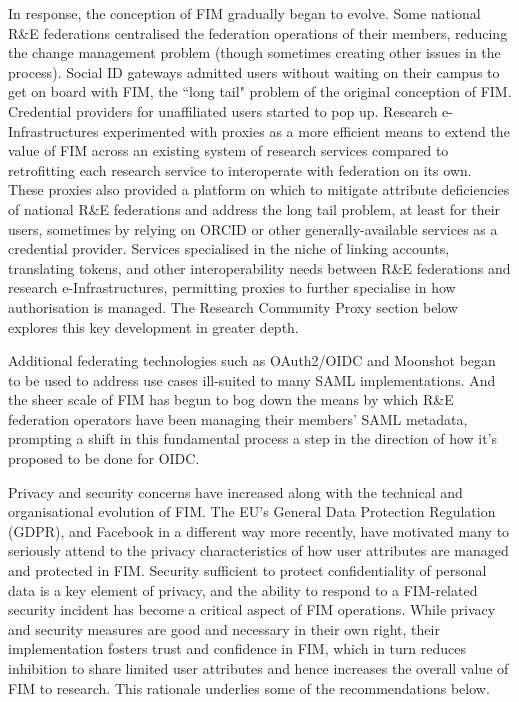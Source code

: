 \documentclass[fleqn,10pt]{wlscirep}
\begin{document}
{In response, the conception of FIM gradually began to evolve. Some national R\&E federations centralised the federation operations of their members, reducing the change management problem (though sometimes creating other issues in the process). Social ID gateways admitted users without waiting on their campus to get on board with FIM, the ``long tail" problem of the original conception of FIM. Credential providers for unaffiliated users started to pop up. Research e-Infrastructures experimented with proxies as a more efficient means to extend the value of FIM across an existing system of research services compared to retrofitting each research service to interoperate with federation on its own. These proxies also provided a platform on which to mitigate attribute deficiencies of national R\&E federations and address the long tail problem, at least for their users, sometimes by relying on ORCID\cite{orcid} or other generally-available services as a credential provider. Services specialised in the niche of linking accounts, translating tokens, and other interoperability needs between R\&E federations and research e-Infrastructures, permitting proxies to further specialise in how authorisation is managed. The Research Community Proxy section below explores this key development in greater depth.

Additional federating technologies such as OAuth2/OIDC\cite{oidc} and Moonshot\cite{moonshot} began to be used to address use cases ill-suited to many SAML implementations. And the sheer scale of FIM has begun to bog down the means by which R\&E federation operators have been managing their members’ SAML metadata, prompting a shift in this fundamental process a step in the direction of how it’s proposed to be done for OIDC\cite{oidcfed}. 

Privacy and security concerns have increased along with the technical and organisational evolution of FIM. The EU’s General Data Protection Regulation (GDPR)\cite{GDPR:2016}\cite{eugdpr}, and Facebook in a different way more recently, have motivated many to seriously attend to the privacy characteristics of how user attributes are managed and protected in FIM\cite{assessdp}\cite{attributerelease}\cite{baseline}\cite{dpcoco}. Security sufficient to protect confidentiality of personal data is a key element of privacy, and the ability to respond to a FIM-related security incident has become a critical aspect of FIM operations\cite{sirtfi}. While privacy and security measures are good and necessary in their own right, their implementation fosters trust and confidence in FIM, which in turn reduces inhibition to share limited user attributes and hence increases the overall value of FIM to research. This rationale underlies some of the recommendations below.

}
\end{document}
